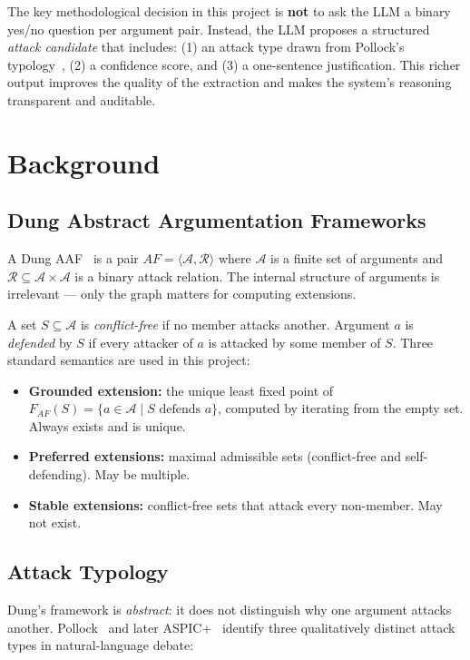 \documentclass[runningheads]{llncs}
\begin{document}
The key methodological decision in this project is \textbf{not} to ask the
LLM a binary yes/no question per argument pair. Instead, the LLM proposes
a structured \emph{attack candidate} that includes: (1) an attack type
drawn from Pollock's typology~\cite{pollock1992}, (2) a confidence score,
and (3) a one-sentence justification. This richer output improves the
quality of the extraction and makes the system's reasoning transparent and
auditable.

\section{Background}
\subsection{Dung Abstract Argumentation Frameworks}

A Dung AAF~\cite{dung1995} is a pair $AF = \langle \mathcal{A},
\mathcal{R} \rangle$ where $\mathcal{A}$ is a finite set of arguments
and $\mathcal{R} \subseteq \mathcal{A} \times \mathcal{A}$ is a binary
attack relation. The internal structure of arguments is irrelevant —
only the graph matters for computing extensions.

A set $S \subseteq \mathcal{A}$ is \emph{conflict-free} if no member
attacks another. Argument $a$ is \emph{defended} by $S$ if every
attacker of $a$ is attacked by some member of $S$. Three standard
semantics are used in this project:

\begin{itemize}
  \item \textbf{Grounded extension:} the unique least fixed point of
    $F_{AF}(S) = \{a \in \mathcal{A} \mid S \text{ defends } a\}$,
    computed by iterating from the empty set. Always exists and is unique.
  \item \textbf{Preferred extensions:} maximal admissible sets (conflict-free
    and self-defending). May be multiple.
  \item \textbf{Stable extensions:} conflict-free sets that attack every
    non-member. May not exist.
\end{itemize}

\subsection{Attack Typology}
\label{sec:taxonomy}

Dung's framework is \emph{abstract}: it does not distinguish why one
argument attacks another. Pollock~\cite{pollock1992} and later
ASPIC+~\cite{modgil2014} identify three qualitatively distinct attack
types in natural-language debate:
\end{document}
